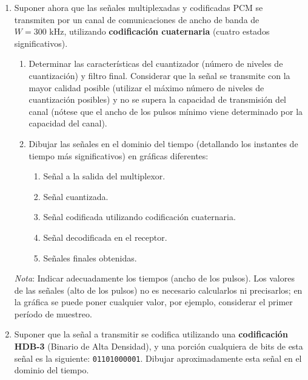 \begin{resolucion}
{\begin{problema}
\begin{enumerate}[label=\alph*)]
    \item Suponer ahora que las señales multiplexadas y codificadas PCM se transmiten por un canal de comunicaciones de ancho de banda de $W = 300\text{ kHz}$, utilizando \textbf{codificación cuaternaria} (cuatro estados significativos).
    \begin{enumerate}[label=\roman*.]
        \item Determinar las características del cuantizador (número de niveles de cuantización) y filtro final. Considerar que la señal se transmite con la mayor calidad posible (utilizar el máximo número de niveles de cuantización posibles) y no se supera la capacidad de transmisión del canal (nótese que el ancho de los pulsos mínimo viene determinado por la capacidad del canal).
        \item Dibujar las señales en el dominio del tiempo (detallando los instantes de tiempo más significativos) en gráficas diferentes:
        \begin{enumerate}[label=\alph*.]
            \item Señal a la salida del multiplexor.
            \item Señal cuantizada.
            \item Señal codificada utilizando codificación cuaternaria.
            \item Señal decodificada en el receptor.
            \item Señales finales obtenidas.
        \end{enumerate}
    \end{enumerate}
    \textit{Nota}: Indicar adecuadamente los tiempos (ancho de los pulsos). Los valores de las señales (alto de los pulsos) no es necesario calcularlos ni precisarlos; en la gráfica se puede poner cualquier valor, por ejemplo, considerar el primer período de muestreo.

    \item Suponer que la señal a transmitir se codifica utilizando una \textbf{codificación HDB-3} (Binario de Alta Densidad), y una porción cualquiera de bits de esta señal es la siguiente: \texttt{01101000001}. Dibujar aproximadamente esta señal en el dominio del tiempo.
\end{enumerate}
\end{problema}

}
\end{resolucion}
